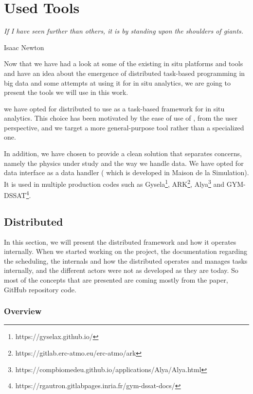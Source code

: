 \chapter{Used Tools}\label{chap:tools}

\vspace{20mm}
\epigraph{\textit{If I have seen further than others, it is by standing upon the shoulders of giants.}} {Isaac Newton}

\vfill

Now that we have had a look at some of the existing in situ platforms and tools and have an idea about the emergence of distributed task-based programming in big data and some attempts at using it for in situ analytics, we are going to present the tools we will use in this work.

we have opted for \dask distributed to use as a task-based framework for in situ analytics. This choice has been motivated by the ease of use of \dask, from the user perspective, and we target a more general-purpose tool rather than a specialized one.

In addition, we have chosen to provide a clean solution that separates concerns, namely the physics under study and the way we handle data. We have opted for \pdi data interface as a data handler ( which is developed in Maison de la Simulation). It is used in multiple production codes such as Gysela\footnote{https://gyselax.github.io/}, ARK\footnote{https://gitlab.erc-atmo.eu/erc-atmo/ark}, Alya\footnote{https://compbiomedeu.github.io/applications/Alya/Alya.html} and GYM-DSSAT\footnote{https://rgautron.gitlabpages.inria.fr/gym-dssat-docs/}.


\newpage

\section{\dask Distributed}\label{sec:dask.distributed}

In this section, we will present the \dask distributed framework and how it operates internally. 
When we started working on the project, the documentation regarding the scheduling, the internals and how the \dask distributed operates and manages tasks internally, and the different actors were not as developed as they are today\cite{noauthor_daskdistributed_nodate}. 
So most of the concepts that are presented are coming mostly from the paper\cite{rocklin_dask_2015}, \dask GitHub repository code\cite{amal_distributed_2022}.

\subsection{Overview}

